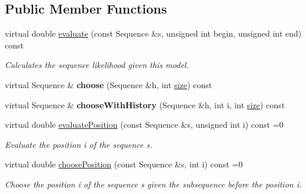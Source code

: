 \subsection*{Public Member Functions}
\begin{DoxyCompactItemize}
\item 
\mbox{\label{classtops_1_1FactorableModel_a17c0f432b4cfc2e1c020ee1c8e430d8a}} 
virtual double \hyperlink{classtops_1_1FactorableModel_a17c0f432b4cfc2e1c020ee1c8e430d8a}{evaluate} (const Sequence \&s, unsigned int begin, unsigned int end) const
\begin{DoxyCompactList}\small\item\em Calculates the sequence likelihood given this model. \end{DoxyCompactList}\item 
\mbox{\label{classtops_1_1FactorableModel_ab9ba9cadb152b0090db9f71e119860c2}} 
virtual Sequence \& {\bfseries choose} (Sequence \&h, int \hyperlink{classtops_1_1ProbabilisticModel_a4e3910e9b9b848b7078e7101909ae82a}{size}) const
\item 
\mbox{\label{classtops_1_1FactorableModel_a472415d5e60ee110433b54e7d1e61d3f}} 
virtual Sequence \& {\bfseries choose\+With\+History} (Sequence \&h, int i, int \hyperlink{classtops_1_1ProbabilisticModel_a4e3910e9b9b848b7078e7101909ae82a}{size}) const
\item 
\mbox{\label{classtops_1_1FactorableModel_a74539e31c71e45590d76fe3173fe0d49}} 
virtual double \hyperlink{classtops_1_1FactorableModel_a74539e31c71e45590d76fe3173fe0d49}{evaluate\+Position} (const Sequence \&s, unsigned int i) const =0
\begin{DoxyCompactList}\small\item\em Evaluate the position i of the sequence s. \end{DoxyCompactList}\item 
\mbox{\label{classtops_1_1FactorableModel_a5d97e3ee9ed36526175a06c9605aab98}} 
virtual double \hyperlink{classtops_1_1FactorableModel_a5d97e3ee9ed36526175a06c9605aab98}{choose\+Position} (const Sequence \&s, int i) const =0
\begin{DoxyCompactList}\small\item\em Choose the position i of the sequence s given the subsequence before the position i. \end{DoxyCompactList}\item 

\end{DoxyCompactItemize}
